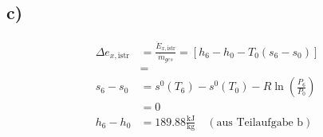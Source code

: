 

\subsection*{c)}

\begin{align*}
\Delta e_{x,\text{istr}} &= \frac{\dot{E}_{x,\text{istr}}}{\dot{m}_{ges}} = \left[ h_6 - h_0 - T_0 (s_6 - s_0) \right] \\
&= \\
s_6 - s_0 &= s^0(T_6) - s^0(T_0) - R \ln \left( \frac{P_6}{P_0} \right) \\
&= 0 \\
h_6 - h_0 &= 189.88 \frac{\text{kJ}}{\text{kg}} \quad (\text{aus Teilaufgabe b})
\end{align*}